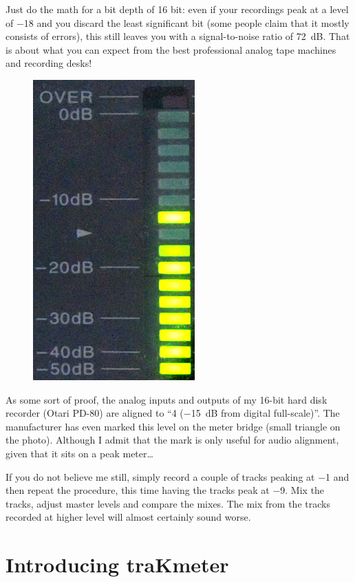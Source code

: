 Just do the math for a bit depth of 16 bit: even if your recordings
peak at a level of \SI{-18}{\dBFS} and you discard the least
significant bit (some people claim that it mostly consists of errors),
this still leaves you with a signal-to-noise ratio of \SI{72}{\dB}.
That is about what you can expect from the best professional analog
tape machines and recording desks!

\begin{figure}
  \includegraphics[scale=0.24,clip]{include/images/otari_meter.png}
\end{figure}

As some sort of proof, the analog inputs and outputs of my 16-bit hard
disk recorder (Otari PD-80) are aligned to
``\SI[addsign=all]{+4}{\dBu} (\SI{-15}{\dB} from digital
full-scale)''.  The manufacturer has even marked this level on the
meter bridge (small triangle on the photo).  Although I admit that the
mark is only useful for audio alignment, given that it sits on a peak
meter\ldots

If you do not believe me still, simply record a couple of tracks
peaking at \SI{-1}{\dBFS} and then repeat the procedure, this time
having the tracks peak at \SI{-9}{\dBFS}.  Mix the tracks, adjust
master levels and compare the mixes.  The mix from the tracks recorded
at higher level will almost certainly sound worse.

\section{Introducing traKmeter}
\label{sec:introducing_trakmeter}


